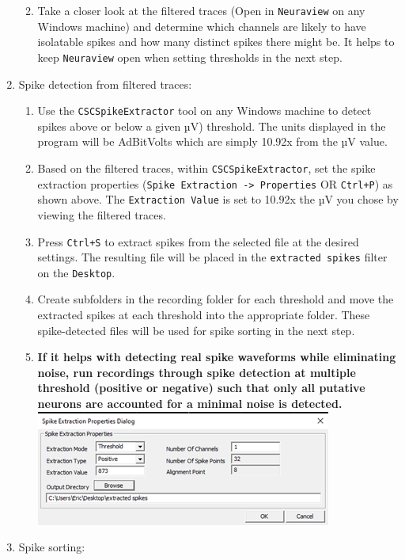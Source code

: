 \documentclass[
]{book}
\providecommand{\tightlist}{%
  \setlength{\itemsep}{0pt}\setlength{\parskip}{0pt}}
\begin{document}
\begin{enumerate}
  \begin{enumerate}
  \def\labelenumii{\arabic{enumii}.}
  \tightlist
  \item
    Take a closer look at the filtered traces (Open in \texttt{Neuraview}
    on any Windows machine) and determine which channels are
    likely to have isolatable spikes and how many distinct spikes
    there might be. It helps to keep \texttt{Neuraview} open when setting
    thresholds in the next step.
  \end{enumerate}
\item
  Spike detection from filtered traces:

  \begin{enumerate}
  \def\labelenumii{\arabic{enumii}.}
  \tightlist
  \item
    Use the \texttt{CSCSpikeExtractor} tool on any Windows machine to
    detect spikes above or below a given µV) threshold. The units
    displayed in the program will be AdBitVolts which are simply
    10.92x from the µV value.
  \item
    Based on the filtered traces, within \texttt{CSCSpikeExtractor}, set
    the spike extraction properties
    (\texttt{Spike\ Extraction\ -\textgreater{}\ Properties} OR \texttt{Ctrl+P}) as shown above.
    The \texttt{Extraction\ Value} is set to 10.92x the µV you chose by
    viewing the filtered traces.
  \item
    Press \texttt{Ctrl+S} to extract spikes from the selected file at the
    desired settings. The resulting file will be placed in the
    \texttt{extracted\ spikes} filter on the \texttt{Desktop}.
  \item
    Create subfolders in the recording folder for each threshold
    and move the extracted spikes at each threshold into the
    appropriate folder. These spike-detected files will be used
    for spike sorting in the next step.
  \item
    \textbf{If it helps with detecting real spike waveforms while
    eliminating noise, run recordings through spike detection at
    multiple threshold (positive or negative) such that only all
    putative neurons are accounted for a minimal noise is
    detected.}
    \includegraphics{source_images/sec3.2.2_spike_extraction_properties.png}
  \end{enumerate}
\item
  Spike sorting:


\end{enumerate}
\end{document}
